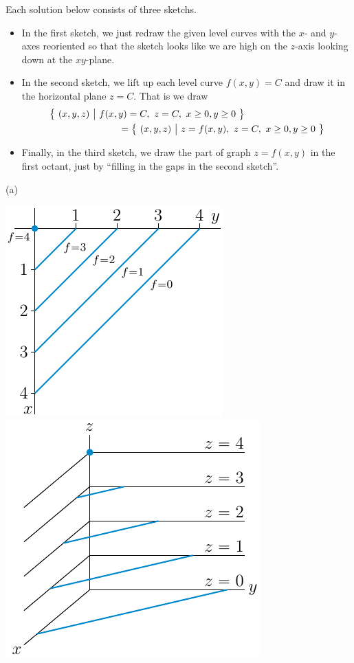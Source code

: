 \begin{solution}
Each solution below consists of three sketchs.
\begin{itemize}
\item 
In the first sketch, we just redraw the given level curves with the
$x$- and $y$-axes reoriented so that the sketch looks like we are high on the $z$-axis looking down at the $xy$-plane.

\item 
In the second sketch, we lift up each level curve $f(x,y)=C$ and draw it in 
the horizontal plane $z=C$. That is we draw 
\begin{align*}
&\big\{ \ (x,y,z)\ \big|\ f(x,y)=C,\ z=C,\ x\ge 0, y\ge 0\ \big\} \\
&\hskip1in=\big\{ \ (x,y,z)\ \big|\ z=f(x,y),\ z=C,\ x\ge 0, y\ge 0\ \big\}
\end{align*}

\item
Finally, in the third sketch, we draw the part of graph $z=f(x,y)$ in the
first octant, just by ``filling in the gaps in the second sketch''.
\end{itemize}

(a)
\begin{center}
  \includegraphics{fig/planeLevelB.pdf}
\qquad
  \includegraphics{fig/planeGraphA.pdf}
\end{center}


\end{solution}
